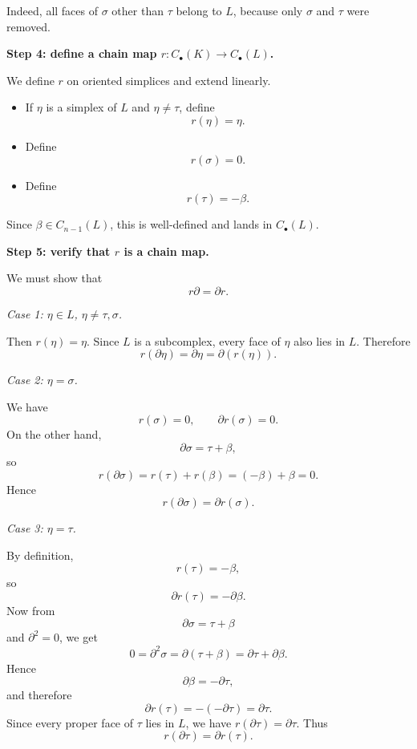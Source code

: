 \begin{solution}
Indeed, all faces of \(\sigma\) other than \(\tau\) belong to \(L\), because only \(\sigma\) and \(\tau\) were removed.

\par

\textbf{Step 4: define a chain map \(r:C_\bullet(K)\to C_\bullet(L)\).}

We define \(r\) on oriented simplices and extend linearly.

\begin{itemize}
	\item If \(\eta\) is a simplex of \(L\) and \(\eta\neq \tau\), define
	\[
	r(\eta)=\eta.
	\]

	\item Define
	\[
	r(\sigma)=0.
	\]

	\item Define
	\[
	r(\tau)=-\beta.
	\]
\end{itemize}

Since \(\beta\in C_{n-1}(L)\), this is well-defined and lands in \(C_\bullet(L)\).

\par

\textbf{Step 5: verify that \(r\) is a chain map.}

We must show that
\[
r\partial = \partial r.
\]

\par

\emph{Case 1: \(\eta\in L\), \(\eta\neq \tau,\sigma\).}

Then \(r(\eta)=\eta\). Since \(L\) is a subcomplex, every face of \(\eta\) also lies in \(L\). Therefore
\[
r(\partial \eta)=\partial \eta=\partial(r(\eta)).
\]

\par

\emph{Case 2: \(\eta=\sigma\).}

We have
\[
r(\sigma)=0,
\qquad
\partial r(\sigma)=0.
\]
On the other hand,
\[
\partial \sigma = \tau+\beta,
\]
so
\[
r(\partial \sigma)=r(\tau)+r(\beta)=(-\beta)+\beta=0.
\]
Hence
\[
r(\partial \sigma)=\partial r(\sigma).
\]

\par

\emph{Case 3: \(\eta=\tau\).}

By definition,
\[
r(\tau)=-\beta,
\]
so
\[
\partial r(\tau)= -\partial \beta.
\]
Now from
\[
\partial \sigma = \tau+\beta
\]
and \(\partial^2=0\), we get
\[
0=\partial^2 \sigma = \partial(\tau+\beta)=\partial \tau+\partial \beta.
\]
Hence
\[
\partial \beta = -\partial \tau,
\]
and therefore
\[
\partial r(\tau)= -(-\partial \tau)=\partial \tau.
\]
Since every proper face of \(\tau\) lies in \(L\), we have \(r(\partial \tau)=\partial \tau\). Thus
\[
r(\partial \tau)=\partial r(\tau).
\]


\end{solution}
